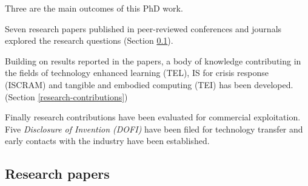 Three are the main outcomes of this PhD work.

Seven research papers published in peer-reviewed conferences and journals explored the research questions (Section \ref{research-papers}).

Building on results reported in the papers, a body of knowledge contributing in the fields of technology enhanced learning (TEL), IS for crisis response (ISCRAM) and tangible and embodied computing (TEI) has been developed. (Section \ref{research-contributions})

Finally research contributions have been evaluated for commercial exploitation. Five \emph{Disclosure of Invention (DOFI)} have been filed for technology transfer and early contacts with the industry have been established.

\subsection{Research papers}\label{research-papers}

